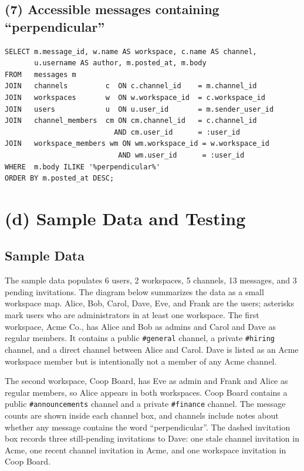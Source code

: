 \documentclass[11pt,letterpaper]{article}
\begin{document}
\subsection*{(7) Accessible messages containing ``perpendicular''}
\begin{lstlisting}
SELECT m.message_id, w.name AS workspace, c.name AS channel,
       u.username AS author, m.posted_at, m.body
FROM   messages m
JOIN   channels         c  ON c.channel_id    = m.channel_id
JOIN   workspaces       w  ON w.workspace_id  = c.workspace_id
JOIN   users            u  ON u.user_id       = m.sender_user_id
JOIN   channel_members  cm ON cm.channel_id   = c.channel_id
                          AND cm.user_id      = :user_id
JOIN   workspace_members wm ON wm.workspace_id = w.workspace_id
                           AND wm.user_id      = :user_id
WHERE  m.body ILIKE '%perpendicular%'
ORDER BY m.posted_at DESC;
\end{lstlisting}

\section*{(d) Sample Data and Testing}

\subsection*{Sample Data}

The sample data populates 6 users, 2 workspaces, 5 channels, 13 messages, and
3 pending invitations. The diagram below summarizes the data as a small
workspace map. Alice, Bob, Carol, Dave, Eve, and Frank are the users; asterisks
mark users who are administrators in at least one workspace. The first
workspace, Acme Co., has Alice and Bob as admins and Carol and Dave as regular
members. It contains a public \texttt{\#general} channel, a private
\texttt{\#hiring} channel, and a direct channel between Alice and Carol. Dave is
listed as an Acme workspace member but is intentionally not a member of any
Acme channel.

The second workspace, Coop Board, has Eve as admin and Frank and Alice as
regular members, so Alice appears in both workspaces. Coop Board contains a
public \texttt{\#announcements} channel and a private \texttt{\#finance}
channel. The message counts are shown inside each channel box, and channels
include notes about whether any message contains the word ``perpendicular''.
The dashed invitation box records three still-pending
invitations to Dave: one stale channel invitation in Acme, one recent channel
invitation in Acme, and one workspace invitation in Coop Board.
\end{document}
